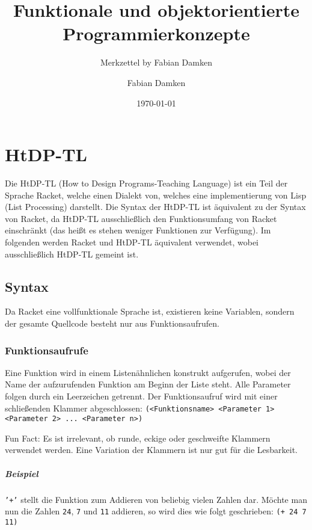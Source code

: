 \documentclass[a4paper, 11pt, accentcolor = tud3b]{tudreport}
\title{Funktionale und objektorientierte Programmierkonzepte}
\subtitle{Merkzettel by Fabian Damken}
\author{Fabian Damken}
\date{\today}
\newcommand{\funfact}[1]{Fun Fact: #1}
\begin{document}
    \maketitle
    \tableofcontents
    \listoftodos


    \chapter{HtDP-TL}
        Die HtDP-TL (How to Design Programs-Teaching Language) ist ein Teil der Sprache Racket, welche einen Dialekt von, welches eine implementierung von Lisp (List Processing) darstellt. Die Syntax der HtDP-TL ist äquivalent zu der Syntax von Racket, da HtDP-TL ausschließlich den Funktionsumfang von Racket einschränkt (das heißt es stehen weniger Funktionen zur Verfügung). Im folgenden werden Racket und HtDP-TL äquivalent verwendet, wobei ausschließlich HtDP-TL gemeint ist.

        \section{Syntax}
            Da Racket eine vollfunktionale Sprache ist, existieren keine Variablen, sondern der gesamte Quellcode besteht nur aus Funktionsaufrufen.

            \subsection{Funktionsaufrufe}
                Eine Funktion wird in einem Listenähnlichen konstrukt aufgerufen, wobei der Name der aufzurufenden Funktion am Beginn der Liste steht. Alle Parameter folgen durch ein Leerzeichen getrennt. Der Funktionsaufruf wird mit einer schließenden Klammer abgeschlossen: \texttt{(<Funktionsname> <Parameter 1> <Parameter 2> ... <Parameter n>)}

                \funfact{Es ist irrelevant, ob runde, eckige oder geschweifte Klammern verwendet werden. Eine Variation der Klammern ist nur gut für die Lesbarkeit.}

                \paragraph{Beispiel}
                    \texttt{'+'} stellt die Funktion zum Addieren von beliebig vielen Zahlen dar. Möchte man nun die Zahlen \texttt{24}, \texttt{7} und \texttt{11} addieren, so wird dies wie folgt geschrieben: \texttt{(+ 24 7 11)}
\end{document}
